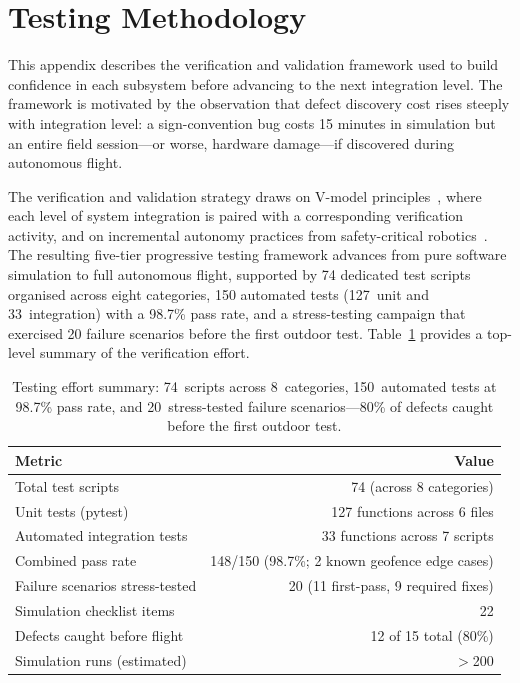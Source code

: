 \section{Testing Methodology}\label{sec:testing}

This appendix describes the verification and validation framework used to build confidence in each subsystem before advancing to the next integration level.  The framework is motivated by the observation that defect discovery cost rises steeply with integration level: a sign-convention bug costs 15 minutes in simulation but an entire field session---or worse, hardware damage---if discovered during autonomous flight.

The verification and validation strategy draws on V-model principles~\cite{forsberg1991relationship}, where each level of system integration is paired with a corresponding verification activity, and on incremental autonomy practices from safety-critical robotics~\cite{koopman2016challenges}. The resulting five-tier progressive testing framework advances from pure software simulation to full autonomous flight, supported by 74 dedicated test scripts organised across eight categories, 150 automated tests (127~unit and 33~integration) with a 98.7\% pass rate, and a stress-testing campaign that exercised 20 failure scenarios before the first outdoor test.  Table~\ref{tab:test-summary-topline} provides a top-level summary of the verification effort.

\begin{table}[H]
\centering
\caption{Testing effort summary: 74~scripts across 8~categories, 150~automated tests at 98.7\% pass rate, and 20~stress-tested failure scenarios---80\% of defects caught before the first outdoor test.}
\label{tab:test-summary-topline}
\small
\begin{tabular}{@{}lr@{}}
\toprule
\textbf{Metric} & \textbf{Value} \\
\midrule
Total test scripts & 74 (across 8 categories) \\
Unit tests (pytest) & 127 functions across 6 files \\
Automated integration tests & 33 functions across 7 scripts \\
Combined pass rate & 148/150 (98.7\%; 2 known geofence edge cases) \\
Failure scenarios stress-tested & 20 (11 first-pass, 9 required fixes) \\
Simulation checklist items & 22 \\
Defects caught before flight & 12 of 15 total (80\%) \\
Simulation runs (estimated) & $>$200 \\
\bottomrule
\end{tabular}
\end{table}

